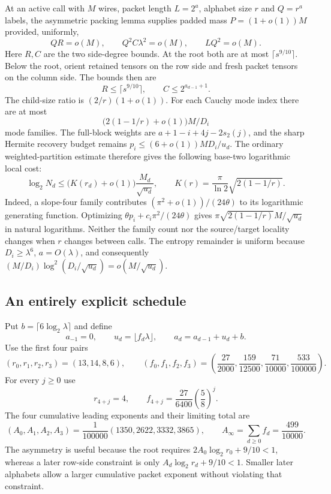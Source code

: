 At an active call with $M$ wires, packet length $L=2^a$, alphabet size $r$
and $Q=r^a$ labels, the asymmetric packing lemma supplies padded mass
$P=(1+o(1))M$ provided, uniformly,
\[
 QR=o(M),\qquad Q^2C\lambda^2=o(M),\qquad LQ^2=o(M).
\]
Here $R,C$ are the two side-degree bounds.  At the root both are at most
$\lceil s^{9/10}\rceil$.  Below the root, orient retained tensors on the
row side and fresh packet tensors on the column side.  The bounds then are
\[
 R\le\lceil s^{9/10}\rceil,
 \qquad C\le 2^{a_{d-1}+1}.
\]
The child-size ratio is $(2/r)(1+o(1))$.  For each Cauchy mode index there
are at most
\[
 \bigl(2(1-1/r)+o(1)\bigr)M/D_i
\]
mode families.  The full-block weights are
$a+1-i+4j-2s_2(j)$, and the sharp Hermite recovery budget remains
$p_i\le(6+o(1))MD_i/u_d$.  The ordinary weighted-partition estimate
therefore gives the following base-two logarithmic local cost:
\begin{equation}\label{eq:multi-local}
 \log_2 N_d\le\bigl(K(r_d)+o(1)\bigr)\frac{M_d}{\sqrt{u_d}},
 \qquad K(r)=\frac{\pi}{\ln2}\sqrt{2(1-1/r)}.
\end{equation}
Indeed, a slope-four family contributes
$(\pi^2+o(1))/(24\theta)$ to its logarithmic generating function.
Optimizing $\theta p_i+c_i\pi^2/(24\theta)$ gives
$\pi\sqrt{2(1-1/r)}M/\sqrt{u_d}$ in natural logarithms.  Neither the
family count nor the source/target locality changes when $r$ changes
between calls. The entropy remainder is uniform because
$D_i\ge\lambda^6$, $a=O(\lambda)$, and consequently
$(M/D_i)\log^2(D_i/\sqrt{u_d})=o(M/\sqrt{u_d})$.

\subsection{An entirely explicit schedule}

Put $b=\lceil6\log_2\lambda\rceil$ and define
\[
 a_{-1}=0,\qquad u_d=\lfloor f_d\lambda\rfloor,
 \qquad a_d=a_{d-1}+u_d+b.
\]
Use the first four pairs
\[
 (r_0,r_1,r_2,r_3)=(13,14,8,6),\qquad
 (f_0,f_1,f_2,f_3)=
 \left(\frac{27}{2000},\frac{159}{12500},
       \frac{71}{10000},\frac{533}{100000}\right).
\]
For every $j\ge0$ use
\[
 r_{4+j}=4,\qquad
 f_{4+j}=\frac{27}{6400}\left(\frac58\right)^j.
\]
The four cumulative leading exponents and their limiting total are
\[
 (A_0,A_1,A_2,A_3)
 =\frac1{100000}(1350,2622,3332,3865),
 \qquad A_\infty=\sum_{d\ge0}f_d=\frac{499}{10000}.
\]
The asymmetry is useful because the root requires
$2A_0\log_2r_0+9/10<1$, whereas a later row-side constraint is only
$A_d\log_2r_d+9/10<1$.  Smaller later alphabets allow a larger cumulative
packet exponent without violating that constraint.

